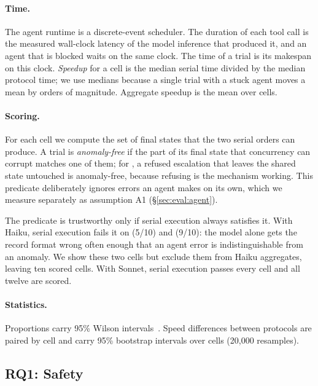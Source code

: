 \paragraph{Time.}
The agent runtime is a discrete-event scheduler. The duration of each tool
call is the measured wall-clock latency of the model inference that produced
it, and an agent that is blocked waits on the same clock. The time of a trial
is its makespan on this clock. \emph{Speedup} for a cell is the median serial
time divided by the median protocol time; we use medians because a single
trial with a stuck agent moves a mean by orders of magnitude. Aggregate
speedup is the mean over cells.

\paragraph{Scoring.}
For each cell we compute the set of final states that the two serial orders
can produce. A trial is \emph{anomaly-free} if the part of its final state
that concurrency can corrupt matches one of them; for , a
refused escalation that leaves the shared state untouched is anomaly-free,
because refusing is the mechanism working. This predicate deliberately ignores
errors an agent makes on its own, which we measure separately as assumption A1
(\S\ref{sec:eval:agent}).

The predicate is trustworthy only if serial execution always satisfies it.
With Haiku, serial execution fails it on  (5/10) and
 (9/10): the model alone gets the record format wrong
often enough that an agent error is indistinguishable from an anomaly. We
show these two cells but exclude them from Haiku aggregates, leaving ten
scored cells. With Sonnet, serial execution passes every cell and all twelve
are scored.

\paragraph{Statistics.}
Proportions carry 95\% Wilson intervals~\cite{wilson1927}. Speed differences
between protocols are paired by cell and carry 95\% bootstrap intervals over
cells (20{,}000 resamples).

\subsection{RQ1: Safety}
\label{sec:eval:safety}

